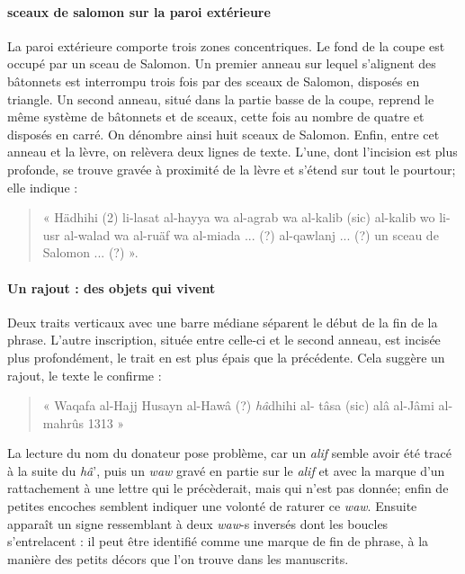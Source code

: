 \paragraph{sceaux de salomon sur la paroi extérieure}La paroi extérieure comporte trois zones concentriques. Le fond de la coupe est occupé par un sceau de Salomon. Un premier anneau sur lequel s'alignent des bâtonnets est interrompu trois fois par des sceaux de Salomon, disposés en triangle. Un second anneau, situé dans la partie basse de la coupe, reprend le même système de bâtonnets et de sceaux, cette fois au nombre de quatre et disposés en carré. On dénombre ainsi huit sceaux de Salomon. Enfin, entre cet anneau et la lèvre, on relèvera deux lignes de texte. L'une, dont l'incision est plus profonde, se trouve gravée à proximité de la lèvre et s'étend sur tout le pourtour; elle indique :
 \begin{quote}
     « Hädhihi (2) li-lasat al-hayya wa al-agrab wa al-kalib (sic) al-kalib wo
li-usr al-walad wa al-ruäf wa al-miada ... (?) al-qawlanj ... (?) un sceau de Salomon ... (?) ».
 \end{quote}
 \paragraph{Un rajout : des objets qui vivent}Deux traits verticaux avec une barre médiane séparent le début de la fin de la phrase. L'autre inscription, située entre celle-ci et le second anneau, est incisée plus profondément, le trait en est plus épais que la précédente. Cela suggère un rajout,
le texte le confirme : 
\begin{quote}
    « Waqafa  al-Hajj Husayn al-Hawâ (?) \textit{hâ}dhihi al-
tâsa (sic) alâ al-Jâmi al-mahrûs 1313 »
\end{quote}   La lecture du nom du donateur pose problème, car un \textit{alif} semble avoir été tracé à la suite du \textit{hâ}', puis un \textit{waw} gravé en partie sur le \textit{alif} et avec la marque d'un rattachement à une lettre qui le précèderait, mais qui n'est pas donnée; enfin de petites encoches semblent indiquer une volonté de raturer ce \textit{waw}.
Ensuite apparaît un signe ressemblant à deux \textit{waw}-s inversés dont les boucles s'entrelacent : il peut être identifié comme une marque de fin de phrase, à la manière des petits décors que l'on trouve dans les manuscrits.

